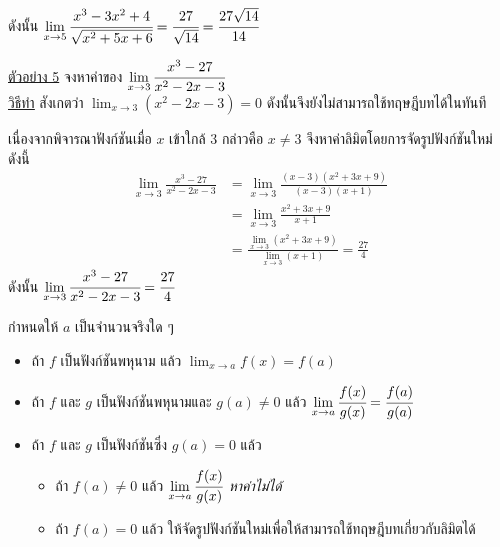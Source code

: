 \documentclass[hidelinks,12pt,a4paper]{article}
\newcommand{\s}{\space}
\newcommand{\qed}{\scalebox{0.8}{$\blacksquare$}}
\begin{document}
\hspace{15mm} ดังนั้น \s $\displaystyle\lim_{x\to 5} \cfrac{x^3-3x^2+4}{\sqrt{x^2+5x+6}}=\cfrac{27}{\sqrt{14}}=\cfrac{27\sqrt{14}}{14}$ \hfill \qed

\vspace{5mm}
\underline{ตัวอย่าง 5} จงหาค่าของ $\displaystyle\lim_{x\to 3} \cfrac{x^3-27}{x^2-2x-3}$ \\[1ex]
\underline{\underline{วิธีทำ}}\hspace{8mm} สังเกตว่า $\displaystyle\lim_{x\to 3} (x^2-2x-3)=0$ ดังนั้นจึงยังไม่สามารถใช้ทฤษฎีบทได้ในทันที

\hspace{15mm} เนื่องจากพิจารณาฟังก์ชันเมื่อ $x$ เข้าใกล้ $3$ กล่าวคือ $x\neq3$ จึงหาค่าลิมิตโดยการจัดรูปฟังก์ชันใหม่ดังนี้
\begin{align*}
    \lim_{x\to 3}\frac{x^3-27}{x^2-2x-3} & = \lim_{x\to 3} \frac{(x-3)(x^2+3x+9)}{(x-3)(x+1)} \\ 
    & = \lim_{x\to 3} \frac{x^2+3x+9}{x+1} \\
    & = \frac{\displaystyle\lim_{x\to 3} (x^2+3x+9)}{\displaystyle\lim_{x\to 3} (x+1)} = \frac{27}{4}
\end{align*}
\hspace{15mm} ดังนั้น \s $\displaystyle\lim_{x\to 3} \cfrac{x^3-27}{x^2-2x-3}=\cfrac{27}{4}$ \hfill \qed

\newpage
\scalebox{1.1}{\textbf{\textcolor{red!90!blue}{สรุปหลักการหาลิมิต}}}

\begin{tcolorbox}[colback=red!10,colframe=red!90!blue]
    กำหนดให้ $a$ เป็นจำนวนจริงใด ๆ
    \begin{itemize}
        \item ถ้า $f$ เป็นฟังก์ชันพหุนาม แล้ว \s $\displaystyle\lim_{x\to a} f(x) = f(a)$
        \item ถ้า $f$ และ $g$ เป็นฟังก์ชันพหุนามและ $g(a)\neq0$ แล้ว \s $\displaystyle\lim_{x\to a} \cfrac{f(x)}{g(x)}=\cfrac{f(a)}{g(a)}$
        \item ถ้า $f$ และ $g$ เป็นฟังก์ชันซึ่ง $g(a)=0$ แล้ว
        \begin{itemize}
            \item ถ้า $f(a)\neq0$ แล้ว \s $\displaystyle\lim_{x\to a} \cfrac{f(x)}{g(x)}$ \s \emph{หาค่าไม่ได้}
            \item ถ้า $f(a)=0$ แล้ว \s ให้จัดรูปฟังก์ชันใหม่เพื่อให้สามารถใช้ทฤษฎีบทเกี่ยวกับลิมิตได้
        \end{itemize}
    \end{itemize}
\end{tcolorbox}
\end{document}
